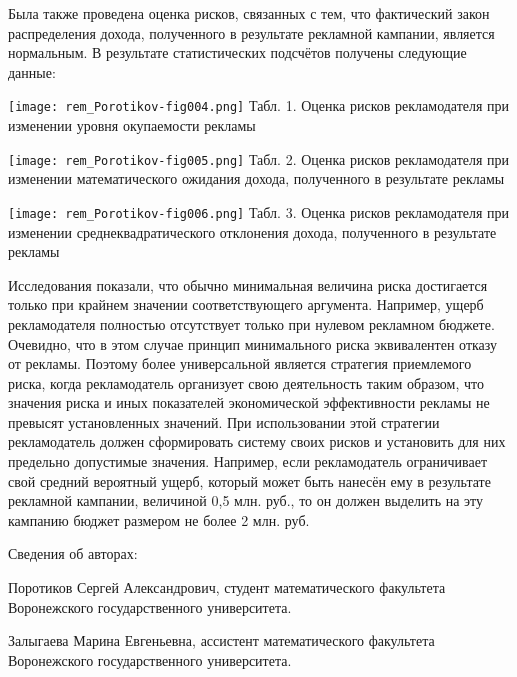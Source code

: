 {Была также проведена оценка рисков, связанных
с тем, что фактический закон распределения
дохода, полученного в результате рекламной
кампании, является нормальным. В результате
статистических подсчётов получены следующие
данные: }


\begin{figure*}[htbp]
	\texttt{[image: rem\_Porotikov-fig004.png]}
	{Табл. 1. Оценка рисков рекламодателя при изменении уровня окупаемости рекламы}
\end{figure*}


\begin{figure*}[htbp]
	\texttt{[image: rem\_Porotikov-fig005.png]}
	Табл. 2.
	Оценка рисков рекламодателя при изменении
	математического ожидания дохода, полученного
	в результате рекламы
\end{figure*}


\begin{figure*}[htbp]
	\texttt{[image: rem\_Porotikov-fig006.png]}
	Табл. 3.
	Оценка рисков рекламодателя при изменении
	среднеквадратического отклонения дохода, полученного
	в результате рекламы
\end{figure*}



{Исследования показали, что обычно минимальная
величина риска достигается только при крайнем
значении соответствующего аргумента. Например,
ущерб рекламодателя полностью отсутствует
только при нулевом рекламном бюджете. Очевидно,
что в этом случае принцип минимального риска
эквивалентен отказу от рекламы. Поэтому более
универсальной является стратегия приемлемого
риска, когда рекламодатель организует
свою деятельность таким образом, что значения
риска и иных показателей экономической эффективности
рекламы не превысят установленных значений.
При использовании этой стратегии рекламодатель
должен сформировать систему своих рисков и
установить для них предельно допустимые значения.
Например, если рекламодатель ограничивает
свой средний вероятный ущерб, который может
быть нанесён ему в результате рекламной кампании,
величиной 0,5 млн. руб., то он должен выделить
на эту кампанию бюджет размером не более 2 млн. руб.}



{Сведения об авторах:}

{Поротиков Сергей Александрович, студент
математического факультета Воронежского государственного
университета.}


{Залыгаева Марина Евгеньевна, ассистент
математического факультета Воронежского государственного
университета.}



